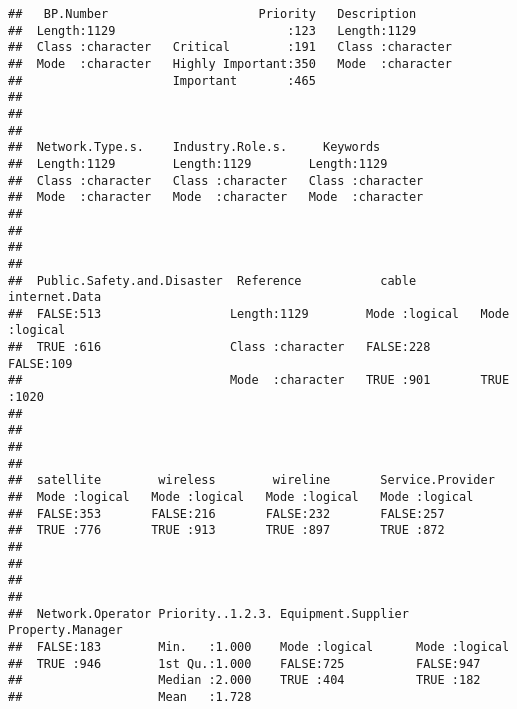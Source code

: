 \documentclass[
]{article}
\begin{document}
\begin{verbatim}
##   BP.Number                     Priority   Description       
##  Length:1129                        :123   Length:1129       
##  Class :character   Critical        :191   Class :character  
##  Mode  :character   Highly Important:350   Mode  :character  
##                     Important       :465                     
##                                                              
##                                                              
##                                                              
##  Network.Type.s.    Industry.Role.s.     Keywords        
##  Length:1129        Length:1129        Length:1129       
##  Class :character   Class :character   Class :character  
##  Mode  :character   Mode  :character   Mode  :character  
##                                                          
##                                                          
##                                                          
##                                                          
##  Public.Safety.and.Disaster  Reference           cable         internet.Data  
##  FALSE:513                  Length:1129        Mode :logical   Mode :logical  
##  TRUE :616                  Class :character   FALSE:228       FALSE:109      
##                             Mode  :character   TRUE :901       TRUE :1020     
##                                                                               
##                                                                               
##                                                                               
##                                                                               
##  satellite        wireless        wireline       Service.Provider
##  Mode :logical   Mode :logical   Mode :logical   Mode :logical   
##  FALSE:353       FALSE:216       FALSE:232       FALSE:257       
##  TRUE :776       TRUE :913       TRUE :897       TRUE :872       
##                                                                  
##                                                                  
##                                                                  
##                                                                  
##  Network.Operator Priority..1.2.3. Equipment.Supplier Property.Manager
##  FALSE:183        Min.   :1.000    Mode :logical      Mode :logical   
##  TRUE :946        1st Qu.:1.000    FALSE:725          FALSE:947       
##                   Median :2.000    TRUE :404          TRUE :182       
##                   Mean   :1.728                                       

\end{verbatim}
\end{document}
